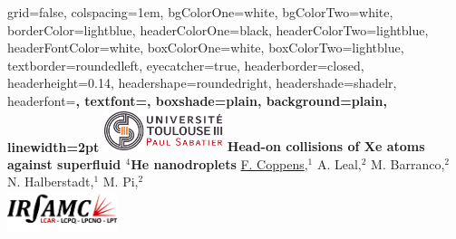 \documentclass[portrait,a0paper,fontscale=0.277]{baposter}
\begin{document}
\begin{poster}%
  {
  grid=false,
  colspacing=1em,
  bgColorOne=white,
  bgColorTwo=white,
  borderColor=lightblue,
  headerColorOne=black,
  headerColorTwo=lightblue,
  headerFontColor=white,
  boxColorOne=white,
  boxColorTwo=lightblue,
  textborder=roundedleft,
  eyecatcher=true,
  headerborder=closed,
  headerheight=0.14\textheight,
  headershape=roundedright,
  headershade=shadelr,
  headerfont=\normalsize\bf\textsc, %
  textfont={\setlength{\parindent}{1.5em}},
  boxshade=plain,
  background=plain,
  linewidth=2pt
  }
  {\includegraphics[height=3.25em]{images/logo1-2.jpeg}} 
  {\bf\Large{Head-on collisions of Xe atoms against superfluid $^4$He nanodroplets}\vspace{0.5em}}
  {\normalsize{ \underline{F. Coppens},$^1$ A. Leal,$^2$ M. Barranco,$^2$ N. Halberstadt,$^1$ M. Pi,$^2$\vspace{0.5em}} \\
}
  {%
   \includegraphics[height=3.25em]{images/logo_irsamc}
  }


\end{poster}
\end{document}
